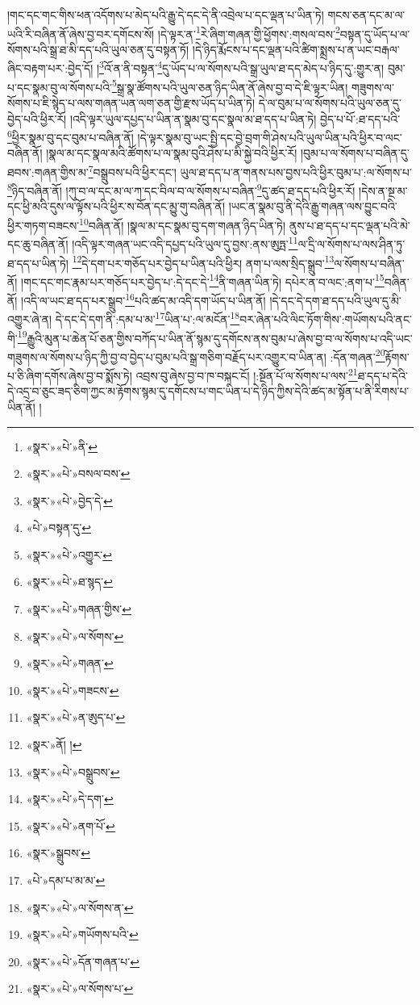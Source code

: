 །གང་དང་གང་གིས་ཕན་འདོགས་པ་མེད་པའི་རྒྱུ་དེ་དང་དེ་ནི་འབྲེལ་པ་དང་ལྡན་པ་ཡིན་ཏེ། གངས་ཅན་དང་མ་ལ་ཡའི་རི་བཞིན་ནོ་ཞེས་བྱ་བར་དགོངས་སོ། །དེ་ལྟར་ན་\footnote{«སྣར་»«པེ་»ནི་}རེ་ཞིག་གཞན་གྱི་ཕྱོགས་:གསལ་བས་\footnote{«སྣར་»«པེ་»བསལ་བས་}བསྟན་དུ་ཡོད་པ་ལ་སོགས་པའི་སྒྲ་ཐ་མི་དད་པའི་ཡུལ་ཅན་དུ་བསྟན་ཏོ། །དེ་ཉིད་རྨོངས་པ་དང་ལྡན་པའི་ཚིག་སྨྲས་པ་ན་ཡང་བརྒལ་ཞིང་བརྟག་པར་:བྱེད་དོ། །\footnote{«སྣར་»«པེ་»བྱེད་དེ་}འོ་ན་ནི་བསྟན་\footnote{«པེ་»བསྟན་དུ་}དུ་ཡོད་པ་ལ་སོགས་པའི་སྒྲ་ཡུལ་ཐ་དད་མེད་པ་ཉིད་དུ་:གྱུར་ན། བུམ་པ་དང་སྣམ་བུ་ལ་སོགས་པའི་\footnote{«སྣར་»«པེ་»འགྱུར་}སྒྲ་སྣ་ཚོགས་པའི་ཡུལ་ཅན་ཉིད་ཡིན་ནོ་ཞེས་བྱ་བ་དེ་ཇི་ལྟར་ཡིན། གཟུགས་ལ་སོགས་པ་ཇི་སྙེད་པ་ལས་གཞན་ཡན་ལག་ཅན་གྱི་རྫས་ཡོད་པ་ཡིན་ཏེ། དེ་ལ་བུམ་པ་ལ་སོགས་པའི་ཡུལ་ཅན་དུ་བྱེད་པའི་ཕྱིར་རོ། །འདི་ལྟར་ཡུལ་དཔྱད་པ་ཡིན་ན་སྣམ་བུ་དང་སྣལ་མ་ཐ་དད་པ་ཡིན་ཏེ། བྱེད་པ་པོ་:ཐ་དད་པའི་\footnote{«སྣར་»«པེ་»ཐ་སྙད་}ཕྱིར་སྣམ་བུ་དང་བུམ་པ་བཞིན་ནོ། །དེ་ལྟར་སྣམ་བུ་ཡང་སྤྱི་དང་བྱེ་བྲག་གི་ཤེས་པའི་ཡུལ་ཡིན་པའི་ཕྱིར་བ་ལང་བཞིན་ནོ། །སྣལ་མ་དང་སྣལ་མའི་ཚོགས་པ་ལ་སྣམ་བུའི་ཤེས་པ་མི་སྐྱེ་བའི་ཕྱིར་རོ། །བུམ་པ་ལ་སོགས་པ་བཞིན་དུ་ཐབས་:གཞན་གྱིས་མ་\footnote{«སྣར་»«པེ་»གཞན་གྱིས་}བསྒྲུབས་པའི་ཕྱིར་དང་། ཡུལ་ཐ་དད་པ་ན་གནས་པས་བྱས་པའི་ཕྱིར་བུམ་པ་:ལ་སོགས་པ་\footnote{«སྣར་»«པེ་»ལ་སོགས་}ཉིད་བཞིན་ནོ། །ཀུ་བ་ལ་དང་མ་ལ་ཀ་དང་བིལ་བ་ལ་སོགས་པ་བཞིན་\footnote{«སྣར་»«པེ་»གཞན་}དུ་ཚད་ཐ་དད་པའི་ཕྱིར་རོ། །དེས་ན་སྔ་མ་དང་ཕྱི་མའི་དུས་ལ་ལྟོས་པའི་ཕྱིར་ས་བོན་དང་མྱུ་གུ་བཞིན་ནོ། །ཡང་ན་སྣམ་བུ་ནི་དེའི་རྒྱུ་གཞན་ལས་བྱུང་བའི་ཕྱིར་གཏག་བཟངས་\footnote{«སྣར་»«པེ་»གཟངས་}བཞིན་ནོ། །སྣལ་མ་དང་སྣམ་བུ་དག་གཞན་ཉིད་ཡིན་ཏེ། ནུས་པ་ཐ་དད་པ་དང་ལྡན་པའི་མེ་དང་ཆུ་བཞིན་ནོ། །འདི་ལྟར་གཞན་ཡང་འདི་དཔྱད་པའི་ཡུལ་དུ་བྱས་:ནས་ཨུཏྤ་\footnote{«སྣར་»«པེ་»ན་ཨུད་པ་}ལ་དྲི་ལ་སོགས་པ་ལས་ཤིན་ཏུ་ཐ་དད་པ་ཡིན་ཏེ། \footnote{«སྣར་»ནོ། ། }དེ་དག་པར་གཅོད་པར་བྱེད་པ་ཡིན་པའི་ཕྱིར། ནག་པ་ལས་སྲིད་སྒྲུབ་\footnote{«སྣར་»«པེ་»བསྒྲུབས་}ལ་སོགས་པ་བཞིན་ནོ། །གང་དང་གང་རྣམ་པར་གཅོད་པར་བྱེད་པ་:དེ་དང་དེ་\footnote{«སྣར་»«པེ་»དེ་དག་}ནི་གཞན་ཡིན་ཏེ། དཔེར་ན་བ་ལང་:ནག་པ་\footnote{«སྣར་»«པེ་»ནག་པོ་}བཞིན་ནོ། །འདི་ལ་ཡང་ཐ་དད་པར་སྒྲུབ་\footnote{«སྣར་»སྒྲུབས་}པའི་ཚད་མ་འདི་དག་ཡོད་པ་ཡིན་ནོ། །དེ་དང་དེ་དག་ཐ་དད་པའི་ཡུལ་དུ་མི་འགྱུར་ཞེ་ན། དེ་དང་དེ་དག་ནི་:དམ་པ་མ་\footnote{«པེ་»དམ་པ་མ་མ་}ཡིན་པ་:ལ་མངོན་\footnote{«སྣར་»«པེ་»ལ་སོགས་ན་}བར་ཞེན་པའི་ལིང་ཏོག་གིས་:གཡོགས་པའི་ནང་གི་\footnote{«སྣར་»«པེ་»གཡོགས་པའི་}རྒྱུའི་མུན་པ་ཆེན་པོ་ཅན་གྱིས་བཀོད་པ་ཡིན་ནོ་སྙམ་དུ་དགོངས་ནས་བུམ་པ་ཞེས་བྱ་བ་ལ་སོགས་པ་འདི་ཡང་གཟུགས་ལ་སོགས་པ་ཉིད་ཀྱི་བྱ་བ་བྱེད་པ་བུམ་པའི་སྒྲ་གཅིག་བརྗོད་པར་འགྱུར་བ་ཡིན་ན། :དོན་གཞན་\footnote{«སྣར་»«པེ་»དོན་གཞན་པ་}རྟོགས་པ་ཅི་ཞིག་དགོས་ཞེས་བྱ་བ་སྨོས་ཏེ། འབྲས་བུ་ཞེས་བྱ་བ་ཁ་བསྐང་ངོ། །:སྔོན་པོ་ལ་སོགས་པ་ལས་\footnote{«སྣར་»«པེ་»ལ་སོགས་པ་}ཐ་དད་པ་དེའི་དེ་འདྲ་བ་ཅུང་ཟད་ཅིག་ཀྱང་མ་རྟོགས་སྙམ་དུ་དགོངས་པ་གང་ཡིན་པ་དེ་ཉིད་ཀྱིས་དེའི་ཚད་མ་སྟོན་པ་ནི་རིགས་པ་ཡིན་ནོ། །
